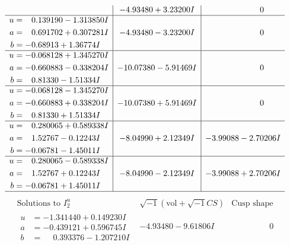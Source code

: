 \documentclass[1p]{elsarticle_modified}
\theoremstyle{definition}
\newcommand{\I}{\sqrt{-1}}
\begin{document}
$$\begin{array}{c|c|c}
 & -4.93480 + 3.23200 I & \phantom{-0.000000 } 0 \\ \hline\begin{aligned}
u &= \phantom{-}0.139190 - 1.313850 I \\
a &= \phantom{-}0.691702 + 0.307281 I \\
b &= -0.68913 + 1.36774 I\end{aligned}
 & -4.93480 - 3.23200 I & \phantom{-0.000000 } 0 \\ \hline\begin{aligned}
u &= -0.068128 + 1.345270 I \\
a &= -0.660883 - 0.338204 I \\
b &= \phantom{-}0.81330 - 1.51334 I\end{aligned}
 & -10.07380 - 5.91469 I & \phantom{-0.000000 } 0 \\ \hline\begin{aligned}
u &= -0.068128 - 1.345270 I \\
a &= -0.660883 + 0.338204 I \\
b &= \phantom{-}0.81330 + 1.51334 I\end{aligned}
 & -10.07380 + 5.91469 I & \phantom{-0.000000 } 0 \\ \hline\begin{aligned}
u &= \phantom{-}0.280065 + 0.589338 I \\
a &= \phantom{-}1.52767 - 0.12243 I \\
b &= -0.06781 - 1.45011 I\end{aligned}
 & -8.04990 + 2.12349 I & -3.99088 - 2.70206 I \\ \hline\begin{aligned}
u &= \phantom{-}0.280065 - 0.589338 I \\
a &= \phantom{-}1.52767 + 0.12243 I \\
b &= -0.06781 + 1.45011 I\end{aligned}
 & -8.04990 - 2.12349 I & -3.99088 + 2.70206 I\\
 \hline 
 \end{array}$$\newpage$$\begin{array}{c|c|c}  
\text{Solutions to }I^u_{2}& \I (\text{vol} + \sqrt{-1}CS) & \text{Cusp shape}\\
 \hline 
\begin{aligned}
u &= -1.341440 + 0.149230 I \\
a &= -0.439121 + 0.596745 I \\
b &= \phantom{-}0.393376 - 1.207210 I\end{aligned}
 & -4.93480 - 9.61806 I & \phantom{-0.000000 } 0 \\ \hline\begin{aligned}

\end{aligned}
\end{array}$$
\end{document}
